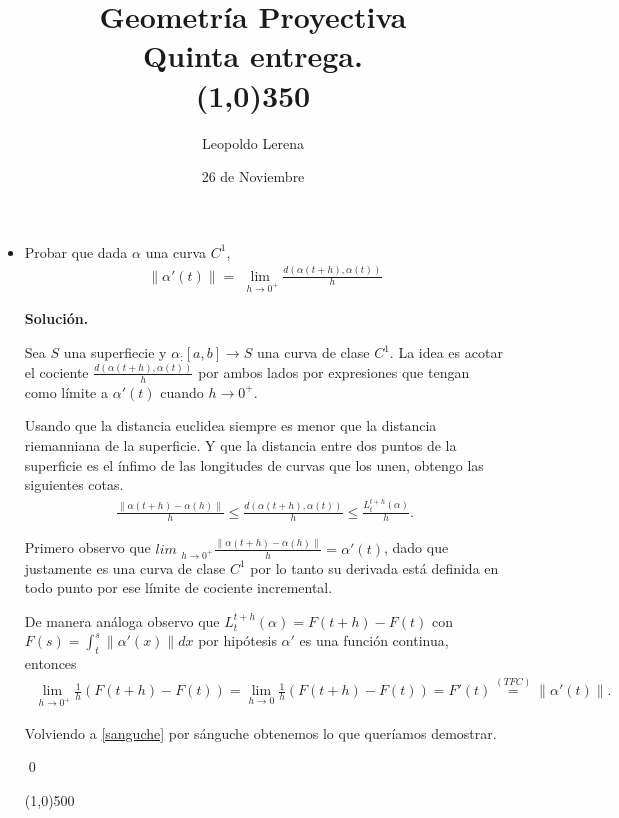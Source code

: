 \documentclass{article}
\title{Geometría Proyectiva \\ \large Quinta entrega.  \\\line(1,0){350}}
\date{26 de Noviembre}
\author{Leopoldo Lerena}
\newenvironment{exercise}[2][Ejercicio]{\begin{trivlist}
		\item[\hskip \labelsep {\bfseries #1}\hskip \labelsep {\bfseries #2.}]}{\end{trivlist}}
\begin{document}
	\maketitle
	\begin{exercise}{1}
		\hspace{0pt}
		\begin{itemize}
			\item[(a)] Probar que dada $\alpha$ una curva $C^1$,
			\begin{align*}
			\|\alpha'(t)\| = \lim_{\ \ h \to 0^+} \frac{d(\alpha(t+h),\alpha(t))}{h}
			\end{align*}
			
			\textbf{Solución.}
			
			Sea $S$ una superfiecie y $\alpha_:[a,b] \to S$ una curva de clase $C^1$. La idea es acotar el cociente $\frac{d(\alpha(t+h),\alpha(t))}{h}$ por ambos lados por expresiones que tengan como límite a $\alpha' (t)$ cuando $h \to 0^+$.
			
			Usando que la distancia euclidea siempre es menor que la distancia riemanniana de la superficie. Y que la distancia entre dos puntos de la superficie es el ínfimo de las longitudes de curvas que los unen, obtengo las siguientes cotas. 
			\begin{align}
			\label{sanguche}
			\frac{\|\alpha(t+h) - \alpha(h)\|}{h} \leq \frac{d(\alpha(t+h),\alpha(t))}{h} \leq \frac{L_t^{t+h}(\alpha)}{h}.
			\end{align}
			
			Primero observo que $ lim_{\ \ h \to 0^+} \frac{\|\alpha(t+h) - \alpha(h)\|}{h} = \alpha' (t) $, dado que justamente es una curva de clase $C^1$ por lo tanto su derivada está definida en todo punto por ese límite de cociente incremental.
			
			De manera análoga observo que $L_t^{t+h}(\alpha) = F(t+h) - F(t)$ con $F(s) = \int_t^s\|\alpha'(x)\|dx$ por hipótesis $\alpha'$ es una función continua, entonces
			\begin{align*}
			\lim_{\ \ h \to 0^+}\frac{1}{h}(F(t+h)-F(t)) = \lim_{h \to 0}\frac{1}{h}(F(t+h)-F(t)) = F'(t) \stackrel{(TFC)}{=} \|\alpha'(t)\|.  
			\end{align*}
			
			Volviendo a \ref{sanguche} por sánguche obtenemos lo que queríamos demostrar.
			
			\qed
			
			\line(1,0){500}
			
			\bigskip
			
			
			

\end{itemize}
\end{exercise}
\end{document}

